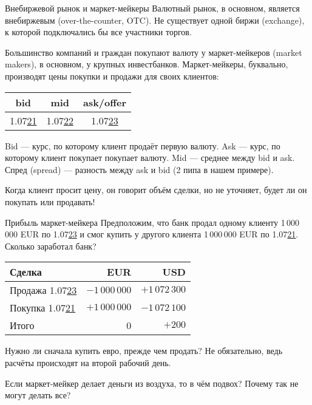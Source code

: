 \documentclass{beamer}
\begin{document}
\begin{frame}{Внебиржевой рынок и маркет-мейкеры}
\justify
Валютный рынок, в основном, является \alert{внебиржевым} (over-the-counter, OTC). Не 
существует одной биржи (exchange), к которой подключались бы все участники торгов.

\justify
Большинство компаний и граждан покупают валюту у маркет-мейкеров (market makers), в 
основном, у крупных инвестбанков. Маркет-мейкеры, буквально, производят цены покупки 
и продажи для своих клиентов:

\centering
\begin{tabular}{c|c|c}
bid & mid & ask/offer \\ \hline
1.07\underline{21} & 1.07\underline{22} & 1.07\underline{23}
\end{tabular}

\justify
Bid --- курс, по которому клиент продаёт первую валюту. Ask --- курс, по которому клиент 
покупает покупает валюту. Mid --- среднее между bid и ask. Спред (spread) --- разность между 
ask и bid (2 пипа в нашем примере).

\justify
Когда клиент просит цену, он говорит объём сделки, но не уточняет, будет ли он покупать или продавать!
\end{frame}



\begin{frame}{Прибыль маркет-мейкера}
\justify
Предположим, что банк продал одному клиенту 1\,000\,000 EUR по 1.07\underline{23} и
смог купить у другого клиента 1\,000\,000 EUR по 1.07\underline{21}. Сколько 
заработал банк?

\centering
\begin{tabular}{l|r|r}
Сделка & EUR & USD \\
\hline
Продажа 1.07\underline{23} & $-1\,000\,000$ & $+1\,072\,300$ \\
Покупка 1.07\underline{21} & $+1\,000\,000$ & $-1\,072\,100$ \\
\hline
Итого & 0 & $+200$
\end{tabular}

\justify
Нужно ли сначала купить евро, прежде чем продать? Не обязательно, ведь расчёты 
происходят на второй рабочий день.

\justify
Если маркет-мейкер делает деньги из воздуха, то в чём подвох? Почему так не могут
делать все?
\end{frame}
\end{document}

